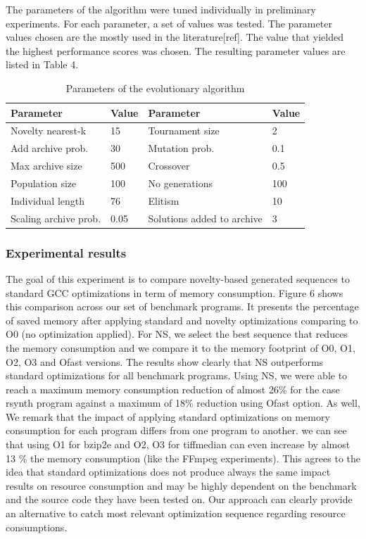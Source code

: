 The parameters of the algorithm were tuned individually in preliminary experiments. For each parameter, a set of values was tested. The parameter values chosen are the mostly used in the literature[ref]. The value that yielded the highest performance scores was chosen. The resulting parameter values are listed in Table 4.
\begin{table}
	\begin{center}
		\caption{Parameters of the evolutionary algorithm}
		\begin{tabular}{ l l || l l }
			Parameter & Value & Parameter & Value \\	\hline
			Novelty nearest-k  & 15 &  Tournament size & 2\\ 
			Add archive prob. & 30 &  Mutation prob. & 0.1\\  
			Max archive size & 500 &  Crossover & 0.5  \\  
			Population size & 100 &  No generations &  100 \\  
			Individual length & 76 & Elitism & 10  \\ 
			Scaling archive prob. & 0.05 & Solutions added to archive & 3  \\ 
		\end{tabular}
	\end{center}
\end{table}

\subsubsection{Experimental results}
The goal of this experiment is to compare novelty-based generated sequences to standard GCC optimizations in term of memory consumption. Figure 6 shows this comparison across our set of benchmark programs. It presents the percentage of saved memory after applying standard and novelty optimizations comparing to O0 (no optimization applied).
For NS, we select the best sequence that reduces the memory consumption and we compare it to the memory footprint of O0, O1, O2, O3 and Ofast versions. The results show clearly that NS outperforms standard optimizations for all benchmark programs. Using NS, we were able to reach a maximum memory consumption reduction of almost 26\% for the case rsynth program against a maximum of 18\% reduction using Ofast option. As well, We remark that the impact of applying standard optimizations on memory consumption for each program differs from one program to another. we can see that using O1 for bzip2e and O2, O3 for tiffmedian can even increase by almost 13 \% the memory consumption (like the FFmpeg experiments). This agrees to the idea that standard optimizations does not produce always the same impact results on resource consumption and may be highly dependent on the benchmark and the source code they have been tested on. Our approach can clearly provide an alternative to catch most relevant optimization sequence regarding resource consumptions.


